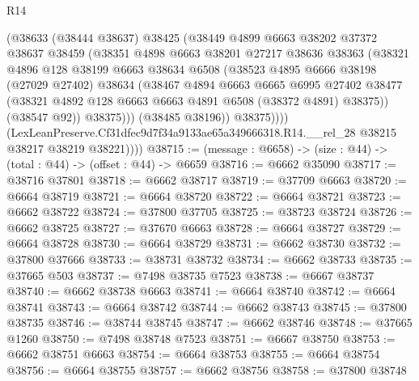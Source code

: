 \begin{lexlean}{R14}
\begin{coremodule}
                  (@38633
                    (@38444 @38637)
                    @38425
                    (@38449
                      @4899
                      @6663
                      @38202
                      @37372
                      @38637
                      @38459
                      (@38351
                        @4898
                        @6663
                        @38201
                        @27217
                        @38636
                        @38363
                        (@38321
                          @4896
                          @128
                          @38199
                          @6663
                          @38634
                          @6508
                          (@38523
                            @4895
                            @6666
                            @38198
                            (@27029 @27402)
                            @38634
                            (@38467
                              @4894
                              @6663
                              @6665
                              @6995
                              @27402
                              @38477
                              (@38321 @4892 @128 @6663 @6663 @4891 @6508 (@38372 @4891) @38375))
                            (@38547 @92))
                          @38375)))
                    (@38485 @38196))
                  @38375))))
          (LexLeanPreserve.Cf31dfec9d7f34a9133ae65a349666318.R14.__rel_28
            @38215
            @38217
            @38219
            @38221))))
@38715 := (message : @6658) -> (size : @44) -> (total : @44) -> (offset : @44) -> @6659
@38716 := @6662 @35090
@38717 := @38716 @37801
@38718 := @6662 @38717
@38719 := @37709 @6663
@38720 := @6664 @38719
@38721 := @6664 @38720
@38722 := @6664 @38721
@38723 := @6662 @38722
@38724 := @37800 @37705
@38725 := @38723 @38724
@38726 := @6662 @38725
@38727 := @37670 @6663
@38728 := @6664 @38727
@38729 := @6664 @38728
@38730 := @6664 @38729
@38731 := @6662 @38730
@38732 := @37800 @37666
@38733 := @38731 @38732
@38734 := @6662 @38733
@38735 := @37665 @503
@38737 := @7498 @38735 @7523
@38738 := @6667 @38737
@38740 := @6662 @38738 @6663
@38741 := @6664 @38740
@38742 := @6664 @38741
@38743 := @6664 @38742
@38744 := @6662 @38743
@38745 := @37800 @38735
@38746 := @38744 @38745
@38747 := @6662 @38746
@38748 := @37665 @1260
@38750 := @7498 @38748 @7523
@38751 := @6667 @38750
@38753 := @6662 @38751 @6663
@38754 := @6664 @38753
@38755 := @6664 @38754
@38756 := @6664 @38755
@38757 := @6662 @38756
@38758 := @37800 @38748

\end{coremodule}
\end{lexlean}

